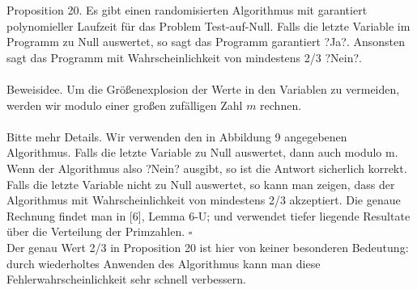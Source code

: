 \documentclass{scrartcl}
\begin{document}
Proposition 20. Es gibt einen randomisierten Algorithmus mit garantiert polynomieller Laufzeit f\"ur das Problem Test-auf-Null. Falls die letzte Variable im Programm zu Null auswertet, so sagt das Programm garantiert ?Ja?. Ansonsten sagt das Programm mit Wahrscheinlichkeit von mindestens 2/3 ?Nein?.\\\\
Beweisidee. Um die Gr\"o\ss enexplosion der Werte in den Variablen zu vermeiden, werden wir modulo einer gro\ss en zuf\"alligen Zahl $m$ rechnen.\\\\
Bitte mehr Details. Wir verwenden den in Abbildung 9 angegebenen Algorithmus. Falls die letzte Variable zu Null auswertet, dann auch modulo m. Wenn der Algorithmus also ?Nein? ausgibt, so ist die Antwort sicherlich korrekt. Falls die letzte Variable nicht zu Null auswertet, so kann man zeigen, dass der Algorithmus mit Wahrscheinlichkeit von mindestens 2/3 akzeptiert. Die genaue Rechnung findet man in [6], Lemma 6-U; und verwendet tiefer liegende Resultate \"uber die Verteilung der Primzahlen. $\square$\\
Der genau Wert 2/3 in Proposition 20 ist hier von keiner besonderen Bedeutung: durch wiederholtes Anwenden des Algorithmus kann man diese Fehlerwahrscheinlichkeit sehr schnell verbessern.\\
\end{document}
